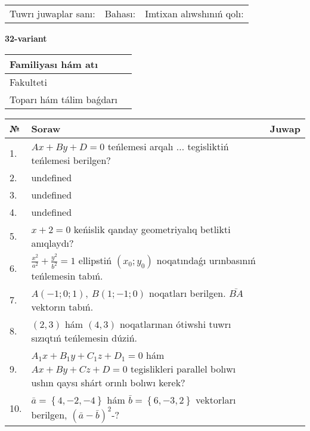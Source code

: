 \documentclass{article}
\begin{document}
\vspace{0.7cm}

\begin{tabular}{lll}
Tuwrı juwaplar sanı: \underline{\hspace{1cm}} & 
Bahası: \underline{\hspace{1cm}} & 
Imtixan alıwshınıń qolı: \underline{\hspace{2cm}} \\
\end{tabular}

\egroup

\newpage


\textbf{32-variant}\\

\bgroup
\def\arraystretch{1.6} %

\begin{tabular}{|m{5.7cm}|m{9.5cm}|}
\hline
Familiyası hám atı & \\
\hline
Fakulteti  & \\
\hline
Toparı hám tálim baǵdarı  & \\
\hline
\end{tabular}

\vspace{0.7cm}

\begin{tabular}{|m{0.7cm}|m{10cm}|m{4cm}|}
\hline
№ & Soraw & Juwap \\
\hline
1. & \(Ax + By + D = 0\) teńlemesi arqalı ... tegisliktiń teńlemesi berilgen? &  \\
\hline
2. & undefined &  \\
\hline
3. & undefined &  \\
\hline
4. & undefined &  \\
\hline
5. & \(x + 2 = 0\) keńislik qanday geometriyalıq betlikti anıqlaydı? &  \\
\hline
6. & \(\frac{x^{2}}{a^{2}} + \frac{y^{2}}{b^{2}} = 1\) ellipstiń \((x_{0};y_{0})\) noqatındaǵı urınbasınıń teńlemesin tabıń. &  \\
\hline
7. & \(A (- 1;0;1),\ B (1; - 1;0)\) noqatları berilgen. \(\bar{BA}\) vektorın tabıń. &  \\
\hline
8. & $(2, 3)$ hám $(4, 3)$ noqatlarınan ótiwshi tuwrı sızıqtıń teńlemesin dúziń. &  \\
\hline
9. & \(A_{1}x + B_{1}y + C_{1}z + D_{1} = 0\) hám \(Ax + By + Cz + D = 0\) tegislikleri parallel bolıwı ushın qaysı shárt orınlı bolıwı kerek? &  \\
\hline
10. & \(\bar{a} = \left\{ 4,- 2,- 4 \right\}\) hám \(\bar{b} = \left\{ 6,- 3, 2 \right\}\) vektorları berilgen, \((\bar{a} - \bar{b}) ^{2}\)-? & \\
\hline
\end{tabular}
\end{document}
